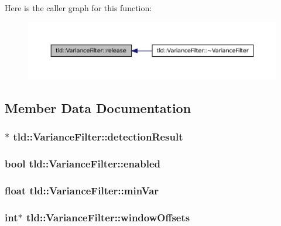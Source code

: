 Here is the caller graph for this function:
\nopagebreak
\begin{figure}[H]
\begin{center}
\leavevmode
\includegraphics[width=400pt]{classtld_1_1_variance_filter_aa5ec15d4b3670db357b1c7372f5ba25a_icgraph}
\end{center}
\end{figure}




\subsection{Member Data Documentation}
\hypertarget{classtld_1_1_variance_filter_a21c300c5f491726705f82429e919ccd9}{
\subsubsection[{detectionResult}]{$\ast$ {\bf tld::VarianceFilter::detectionResult}}}
\label{classtld_1_1_variance_filter_a21c300c5f491726705f82429e919ccd9}
\hypertarget{classtld_1_1_variance_filter_a07f3cd680554508eb6effc4c4b92c322}{
\subsubsection[{enabled}]{\setlength{\rightskip}{0pt plus 5cm}bool {\bf tld::VarianceFilter::enabled}}}
\label{classtld_1_1_variance_filter_a07f3cd680554508eb6effc4c4b92c322}
\hypertarget{classtld_1_1_variance_filter_ad5fd1b805c1cb461a31f61dd6fdb8f07}{
\subsubsection[{minVar}]{\setlength{\rightskip}{0pt plus 5cm}float {\bf tld::VarianceFilter::minVar}}}
\label{classtld_1_1_variance_filter_ad5fd1b805c1cb461a31f61dd6fdb8f07}
\hypertarget{classtld_1_1_variance_filter_a2c8913adc5862adf9eb3034b81c1f02b}{
\subsubsection[{windowOffsets}]{\setlength{\rightskip}{0pt plus 5cm}int$\ast$ {\bf tld::VarianceFilter::windowOffsets}}}
\label{classtld_1_1_variance_filter_a2c8913adc5862adf9eb3034b81c1f02b}


